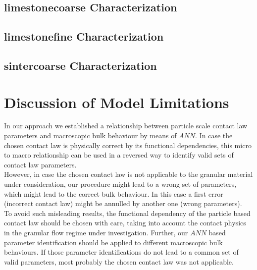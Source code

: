 \lipsum[1]






\subsection{limestonecoarse Characterization}
\label{subsec:limestonecoarsecharacterization}

\lipsum[1]







\subsection{limestonefine Characterization}
\label{subsec:limestonefinecharacterization}

\lipsum[1]





\subsection{sintercoarse Characterization}
\label{subsec:sintercoarsecharacterization}

\lipsum[1]






\section{Discussion of Model Limitations}
\label{sec:discussion}
In our approach we established a relationship between particle scale contact law
parameters and macroscopic bulk behaviour by means of $ANN$. 
In case the chosen contact law is physically correct by its functional dependencies, 
this micro to macro relationship can be used in a reversed way to identify 
valid sets of contact law parameters.\\
However, in case the chosen contact law is not applicable to the granular 
material under consideration, 
our procedure might lead to a wrong set of parameters, which might lead to the
correct bulk behaviour.
In this case a first error (incorrect contact law) might be annulled by another
one (wrong parameters).\\
To avoid such misleading results, the functional dependency of the particle based contact 
law should be chosen with care, taking into account the contact physics in the granular 
flow regime under investigation. 
Further, our $ANN$ based parameter
identification should be applied to different macroscopic bulk behaviours. 
If those parameter identifications do not 
lead to a common set of valid parameters, most probably the chosen contact law was not applicable. 